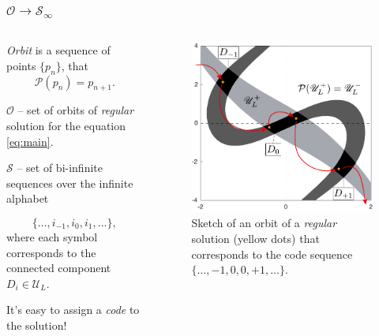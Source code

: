 \documentclass [10pt] {beamer}
\begin{document}
\begin{frame}
	\frametitle{$\mathcal{O} \to \mathcal{S}_{\infty}$}
	\begin{columns}[T]
		\begin{column}{.5\textwidth}
			{\it Orbit} is a sequence of points $\{p_n\}$, that
			\begin{equation*}
				\mathcal{P}(p_n) = p_{n+1}.
			\end{equation*}
			
			$\mathcal{O}$ -- set of orbits of {\it regular} solution for the equation \eqref{eq:main}.

			\vspace{10pt}

			$\mathcal{S}$ -- set of bi-infinite sequences over the infinite alphabet 
			
			\begin{equation*}
				\{\dots, i_{-1}, i_0, i_1, \dots\},
			\end{equation*}
			where each symbol corresponds to the connected component $D_i \in \mathscr{U}_L$.
		
			\begin{center}
				It's easy to assign a {\it code} to the solution!
			\end{center}
		\end{column}
		\begin{column}{.5\textwidth}
			\begin{figure}
			\includegraphics[width = 1\textwidth]{pic/orbit-on-a-phase-plane.pdf}
			\caption{Sketch of an orbit of a {\it regular} solution (yellow dots) that corresponds to the code sequence $\{\dots, -1, 0, 0, +1, \dots\}$.}
			\end{figure}
		\end{column}
	\end{columns}
\end{frame}
\end{document}
